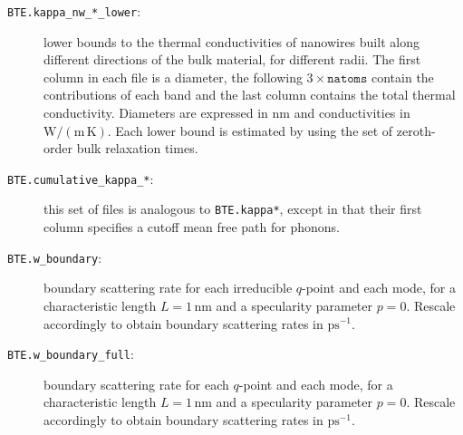 \documentclass[a4paper,10pt,english]{article}
\begin{document}
\begin{description}
\item[\texttt{BTE.kappa\_nw\_*\_lower}:] lower bounds to the thermal conductivities of nanowires built along different directions of the bulk material, for different radii. The first column in each file is a diameter, the following $3\times\mathtt{natoms}$ contain the contributions of each band and the last column contains the total thermal conductivity. Diameters are expressed in $\mathrm{nm}$ and conductivities in $\mathrm{W/\left(m\,K\right)}$. Each lower bound is estimated by using the set of zeroth-order bulk relaxation times.
\item[\texttt{BTE.cumulative\_kappa\_*}:] this set of files is analogous to \texttt{BTE.kappa*}, except in that their first column specifies a cutoff mean free path for phonons.
\item[\texttt{BTE.w\_boundary}:] boundary scattering rate for each irreducible $q$-point and each mode, for a characteristic length $L=1\,\mathrm{nm}$ and a specularity parameter $p=0$. Rescale accordingly to obtain boundary scattering rates in $\mathrm{ps^{-1}}$.
\item[\texttt{BTE.w\_boundary\_full}:] boundary scattering rate for each $q$-point and each mode, for a characteristic length $L=1\,\mathrm{nm}$ and a specularity parameter $p=0$. Rescale accordingly to obtain boundary scattering rates in $\mathrm{ps^{-1}}$.
\end{description}
\end{document}
